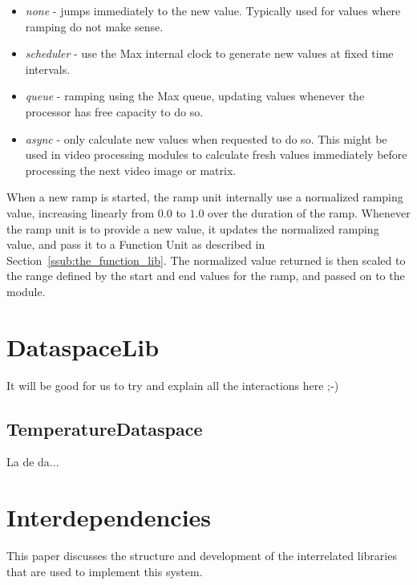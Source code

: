 \documentclass{article}
\begin{document}
\begin{itemize}
	\item \emph{none} - jumps immediately to the new value. Typically used for values where ramping do not make sense.
	\item \emph{scheduler} - use the Max internal clock to generate new values at fixed time intervals.
	\item \emph{queue} - ramping using the Max queue, updating values whenever the processor has free capacity to do so.
	\item \emph{async} - only calculate new values when requested to do so. This might be used in video processing modules to calculate fresh values immediately before processing the next video image or matrix.
\end{itemize}

When a new ramp is started, the ramp unit internally use a normalized ramping value, increasing linearly from $0.0$ to $1.0$ over the duration of the ramp. Whenever the ramp unit is to provide a new value, it updates the normalized ramping value, and pass it to a Function Unit as described in Section~\ref{ssub:the_function_lib}. The normalized value returned is then scaled to the range defined by the start and end values for the ramp, and passed on to the module.



\section{DataspaceLib}\label{sec:dataspacelib}

It will be good for us to try and explain all the interactions here ;-)

\subsection{TemperatureDataspace}\label{subsec:temperature_dataspace}

La de da...



\section{Interdependencies}\label{sec:interdependencies}

This paper discusses the structure and development of the interrelated libraries that are used to implement this system.



\end{document}
